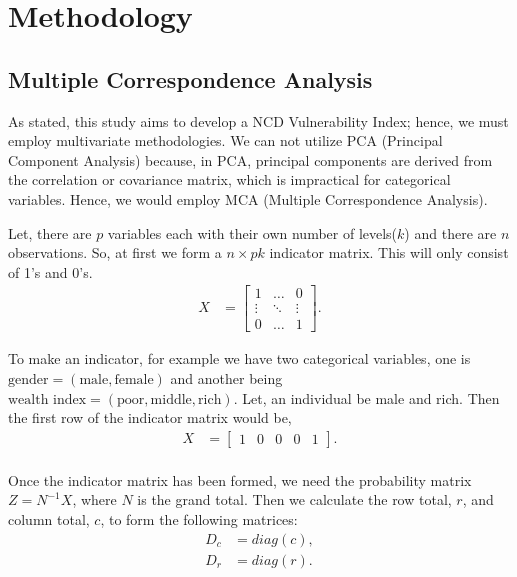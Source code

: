 \documentclass[
  12pt,
  a4paper]{article}
\begin{document}
\section{Methodology}\label{methodology}

\subsection{Multiple Correspondence Analysis}\label{multiple-correspondence-analysis}

As stated, this study aims to develop a NCD Vulnerability Index; hence, we must employ multivariate methodologies. We can not utilize PCA (Principal Component Analysis) because, in PCA, principal components are derived from the correlation or covariance matrix, which is impractical for categorical variables. Hence, we would employ MCA (Multiple Correspondence Analysis).

Let, there are \(p\) variables each with their own number of levels(\(k\)) and there are \(n\) observations. So, at first we form a \(n \times {pk}\) indicator matrix. This will only consist of 1's and 0's.
\begin{align*}
  X &= \begin{bmatrix} 
    1 & \dots & 0\\
    \vdots & \ddots & \vdots\\
    0 & \dots  & 1 
  \end{bmatrix}.
\end{align*}

To make an indicator, for example we have two categorical variables, one is \(\text{gender} = (\text{male}, \text{female})\) and another being \(\text{wealth index} = (\text{poor} , \text{middle}, \text{rich})\). Let, an individual be male and rich. Then the first row of the indicator matrix would be,
\[\begin{aligned}
X &= \begin{bmatrix}
          1 & 0 & 0 & 0 & 1
       \end{bmatrix}. \\
\end{aligned}\]

Once the indicator matrix has been formed, we need the probability matrix \(Z =  N^{-1}X\), where \(N\) is the grand total. Then we calculate the row total, \(r\), and column total, \(c\), to form the following matrices:
\[\begin{aligned} D_{c} &= diag(c),\\ 
D_{r} &= diag(r). \end{aligned} \]
\end{document}
